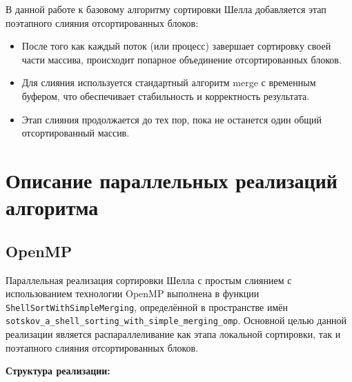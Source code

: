 \documentclass[12pt]{article}
\begin{document}
В данной работе к базовому алгоритму сортировки Шелла добавляется этап поэтапного слияния отсортированных блоков:
\begin{itemize}
\item После того как каждый поток (или процесс) завершает сортировку своей части массива, происходит попарное объединение отсортированных блоков.
\item Для слияния используется стандартный алгоритм merge с временным буфером, что обеспечивает стабильность и корректность результата.
\item Этап слияния продолжается до тех пор, пока не останется один общий отсортированный массив.
\end{itemize}

\section{Описание параллельных реализаций алгоритма}

\subsection{OpenMP}

Параллельная реализация сортировки Шелла с простым слиянием с использованием технологии OpenMP выполнена в функции \texttt{ShellSortWithSimpleMerging}, определённой в пространстве имён \texttt{sotskov\_a\_shell\_sorting\_with\_simple\_merging\_omp}. Основной целью данной реализации является распараллеливание как этапа локальной сортировки, так и поэтапного слияния отсортированных блоков.

\textbf{Структура реализации:}
\end{document}
